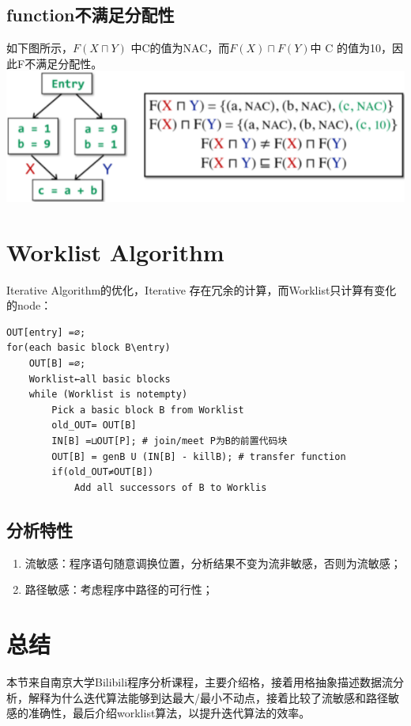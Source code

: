 \documentclass[a4paper]{article}
\theoremstyle{definition}
\begin{document}
\subsection{function不满足分配性}
如下图所示，$F(X \sqcap Y)$ 中C的值为NAC，而$F(X) \sqcap F(Y)$中 C 的值为10，因此F不满足分配性。
\includegraphics{img/distrib.png}
\section{Worklist Algorithm}
Iterative Algorithm的优化，Iterative 存在冗余的计算，而Worklist只计算有变化的node：
\begin{lstlisting}
OUT[entry] =∅;
for(each basic block B\entry) 
	OUT[B] =∅;
    Worklist←all basic blocks
	while (Worklist is notempty) 
    	Pick a basic block B from Worklist
		old_OUT= OUT[B]
        IN[B] =⊔OUT[P]; # join/meet P为B的前置代码块
        OUT[B] = genB U (IN[B] - killB); # transfer function 
        if(old_OUT≠OUT[B])
        	Add all successors of B to Worklis
\end{lstlisting}

\subsection{分析特性}
\begin{enumerate}
  \item 流敏感：程序语句随意调换位置，分析结果不变为流非敏感，否则为流敏感；
  \item 路径敏感：考虑程序中路径的可行性；
\end{enumerate}

\section{总结}
本节来自南京大学Bilibili程序分析课程，主要介绍格，接着用格抽象描述数据流分析，解释为什么迭代算法能够到达最大/最小不动点，接着比较了流敏感和路径敏感的准确性，最后介绍worklist算法，以提升迭代算法的效率。
\end{document}
